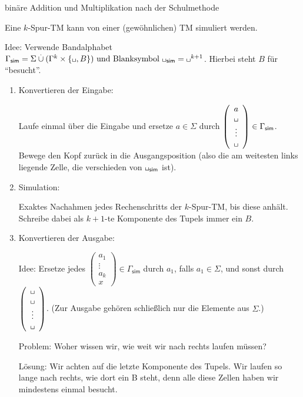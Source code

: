 	\begin{Bsp*}
		binäre Addition und Multiplikation nach der Schulmethode
	\end{Bsp*}

\begin{Bemerkung}
Eine $k$-Spur-\ac{TM} kann von einer (gewöhnlichen) \ac{TM} simuliert werden.

\medskip

Idee: Verwende Bandalphabet $\Gamma_\mathsf{sim} = \Sigma \overset{.}{\cup} (\Gamma^k\times\{\blank, B\})\text{ und Blanksymbol } \blank_\mathsf{sim}=\blank^{k+1}$.
Hierbei steht $B$ für "`besucht"'.

\begin{enumerate}
 \item Konvertieren der Eingabe:
 
 Laufe einmal über die Eingabe und ersetze $a\in\Sigma$ durch $\left(\begin{array}{c}a\\ \mblank\\ \vdots\\ \mblank\end{array}\right)\in\Gamma_\mathsf{sim}$.
 Bewege den Kopf zurück in die Ausgangsposition (also die am weitesten links liegende Zelle, die verschieden von $\blank_\mathsf{sim}$ ist).
 
 \item Simulation:
 
 Exaktes Nachahmen jedes Rechenschritts der $k$-Spur-\ac{TM}, bis diese anhält.
 Schreibe dabei als $k+1$-te Komponente des Tupels immer ein $B$.
 
 \item Konvertieren der Ausgabe:
 
 Idee: Ersetze jedes $\left(\begin{array}{c}a_1\\ \vdots\\ a_k\\ x\end{array}\right)\in\Gamma_\mathsf{sim}$ durch $a_1$, falls $a_1\in\Sigma$, und sonst durch
 $\left(\begin{array}{c}\mblank \\ \mblank\\ \vdots\\ \mblank\end{array}\right)$.
 (Zur Ausgabe gehören schließlich nur die Elemente aus $\Sigma$.)
 
	Problem: Woher wissen wir, wie weit wir nach rechts laufen müssen?
  
  Lösung: Wir achten auf die letzte Komponente des Tupels. 
  Wir laufen so lange nach rechts, wie dort ein B steht, denn alle diese Zellen haben wir mindestens einmal besucht.
  
 \qedhere
\end{enumerate}
\end{Bemerkung}



